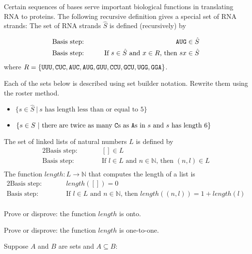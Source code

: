 \documentclass[12pt, oneside]{article}
\begin{document}
Certain 
 sequences of bases serve important biological functions in translating RNA to proteins. The following
 recursive definition gives a special set of RNA strands: The set of RNA strands $\hat{S}$ is defined (recursively)
 by 
 
 \begin{alignat*}{2}
\text{Basis step:} & & \texttt{A}\texttt{U}\texttt{G} \in \hat{S}\\
\text{Basis step:} & \qquad& \text{If } s \in \hat{S} \text{ and } x \in R \text{, then } sx\in \hat{S}\\
 \end{alignat*}
 where $R = \{ \texttt{U}\texttt{U}\texttt{U}, \texttt{C}\texttt{U}\texttt{C}, \texttt{A}\texttt{U}\texttt{C}, \texttt{A}\texttt{U}\texttt{G}, \texttt{G}\texttt{U}\texttt{U}, \texttt{C}\texttt{C}\texttt{U}, \texttt{G}\texttt{C}\texttt{U}, \texttt{U}\texttt{G}\texttt{G}, \texttt{G}\texttt{G}\texttt{A} \}$.

Each of the sets below is described using set builder notation. Rewrite them using the roster method. 
\begin{itemize}
\item $\{s \in \hat{S} ~|~ s \text{ has length less than or equal to $5$} \}$ 

\vfill


\item $\{s \in S ~|~ \text{there are twice as many $\texttt{C}$s as $\texttt{A}$s in $s$ and $s$ has length $6$} \}$ 

\vfill

\end{itemize}
\newpage
The set of linked lists of natural numbers $L$ is defined by 
 \begin{alignat*}{2}
\text{Basis step:} & &[] \in L \\
\text{Basis step:} & \qquad& \text{If } l \in L \text{ and } n \in \mathbb{N} \text{, then } (n,l) \in L\\
 \end{alignat*}
 The function $length: L \to \mathbb{N}$ that computes the length of a list is
  \begin{alignat*}{2}
\text{Basis step:} & &length([]) = 0\\
\text{Basis step:} & \qquad& \text{If $l \in L$ and $n \in \mathbb{N}$, then } length( ( n,l) ) = 1 + length(l)\\
 \end{alignat*}

Prove or disprove: the function $length$ is onto.

\vfill

Prove or disprove: the function $length$ is one-to-one.

\vfill

\newpage
Suppose $A$ and $B$ are sets and $A \subseteq B$:
\end{document}

